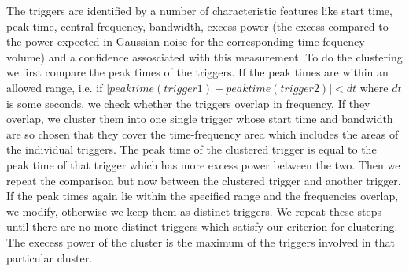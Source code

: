\documentclass{article}
\begin{document}
The triggers are identified by a number of characteristic features like
start time,  peak time,  central frequency,  bandwidth,  excess power (the
excess compared to the power expected in Gaussian noise for the
corresponding time fequency volume)  and a confidence assosciated with this
measurement.  To do the clustering we first compare the peak times of the
triggers.  If the peak times are within an allowed range,  i.e. if
$|peaktime(trigger 1) - peaktime(trigger 2)| < dt$ where $dt$ is some
seconds,  we check whether the triggers  overlap in frequency.  If they
overlap,  we cluster them into one single trigger whose start time and
bandwidth are so chosen that they cover the time-frequency area which
includes the areas of the individual triggers.  The peak time of the
clustered trigger is equal to the peak time of that trigger which has more
excess power between the two.  Then we repeat the comparison but now
between the clustered trigger and another trigger.  If the peak times again
lie within the specified range and the frequencies overlap,  we modify,
otherwise we keep them as distinct triggers.  We repeat these steps until
there are no more distinct triggers which satisfy our criterion for
clustering.  The execess power of the cluster is the maximum of the
triggers involved in that particular cluster.
\end{document}
